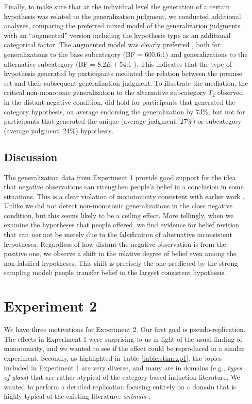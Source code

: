 \documentclass[authoryear,11pt]{elsarticle}
\begin{document}
Finally, to make sure that at the individual level the generation of a certain hypothesis was related to the generalization judgment, we conducted additional analyses, comparing the preferred mixed model of the generalization judgments with an ``augmented'' version including the hypothesis type as an additional categorical factor. The augmented model was clearly preferred , both for generalizations to the base subcategory (BF = 600.6:1) and generalizations to the alternative subcategory (BF = $8.2E+54$:1 ). This indicates that the type of hypothesis generated by participants mediated the relation between the premise set and their subsequent generalization judgment. To illustrate the mediation, the critical non-monotonic generalization to the alternative subcategory $T_2$ observed in the {\sc distant negative} condition, did hold for participants that generated the {\sc category} hypothesis, on average endorsing the generalization by 73\%, but not for participants that generated the {\sc unique} (average judgment: 27\%) or {\sc subcategory} (average judgment: 24\%) hypothesis.

\subsection{Discussion}

The generalization data from Experiment 1 provide good support for the idea that negative observations can strengthen people's belief in a conclusion in some situations. This is a clear violation of monotonicity consistent with earlier work  \citep{Heussenetal2011, KalishLawson2007}. Unlike \citet{Heussenetal2011} we did not detect non-monotonic generalizations in the {\sc close negative} condition, but this seems likely to be a ceiling effect. More tellingly, when we examine the hypotheses that people offered, we find evidence for belief revision that can {\it not} not be merely due to the falsification of alternative inconsistent hypotheses. Regardless of how distant the negative observation is from the positive one, we observe a shift in the relative degree of belief even among the non-falsified hypotheses. This shift is precisely the one predicted by the strong sampling model: people transfer belief to the largest consistent hypothesis.

\section{Experiment 2}

We have three motivations for Experiment 2. Our first goal is pseudo-replication. The effects in Experiment 1 were surprising to us in light of the usual finding of monotonicity, and we wanted to see if the effect could be reproduced in a similar experiment. Secondly, as highlighted in Table \ref{table:stimexp1}, the topics included in Experiment 1 are very diverse, and many are in domains (e.g., {\it types of glass}) that are rather atypical of the category-based induction literature. We wanted to perform a detailed replication focusing entirely on a domain that is highly typical of the existing literature: {\it animals} \citep{Coleyetal2004, Medinetal2003, Oshersonetal1990, Oshersonetal1991, Smithetal1993}.
\end{document}
